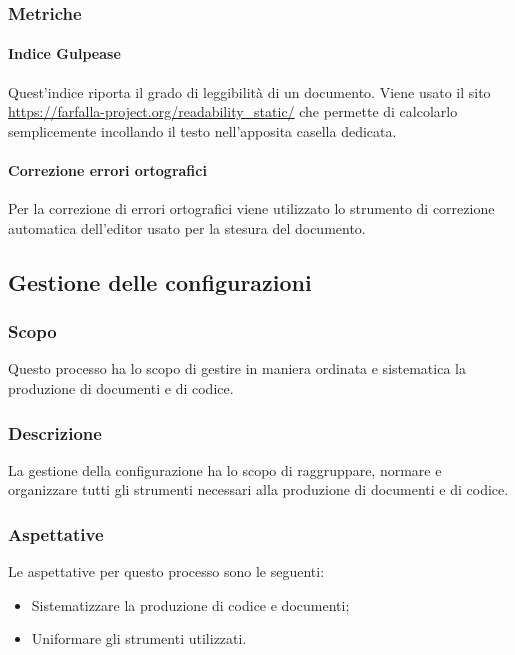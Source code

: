 \documentclass[../norme_di_progetto.tex]{subfiles}
\begin{document}
\subsubsection{Metriche}

\paragraph{Indice Gulpease}
Quest'indice riporta il grado di leggibilità di un documento. Viene usato il sito \url{https://farfalla-project.org/readability_static/} che permette di calcolarlo semplicemente incollando il testo nell'apposita casella dedicata.

\paragraph{Correzione errori ortografici}
Per la correzione di errori ortografici viene utilizzato lo strumento di correzione automatica dell'editor usato per la stesura del documento.

\subsection{Gestione delle configurazioni}

\subsubsection{Scopo}
Questo processo ha lo scopo di gestire in maniera ordinata e sistematica la produzione di documenti e di codice.

\subsubsection{Descrizione}
La gestione della configurazione ha lo scopo di raggruppare, normare e organizzare tutti gli strumenti necessari alla produzione di documenti e di codice.

\subsubsection{Aspettative}
Le aspettative per questo processo sono le seguenti:
\begin{itemize}
    \item Sistematizzare la produzione di codice e documenti;
    \item Uniformare gli strumenti utilizzati.
\end{itemize}
\end{document}
